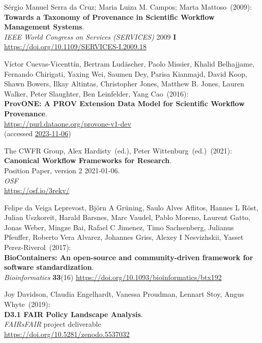 \begin{thebibliography}{9}
Sérgio Manuel Serra da Cruz; Maria Luiza M. Campos; Marta Mattoso~(2009):\\
\textbf{Towards a Taxonomy of Provenance in Scientific Workflow Management Systems}.\\
\emph{IEEE World Congress on Services (SERVICES)} 2009 \textbf{I}\\
\url{https://doi.org/10.1109/SERVICES-I.2009.18}

Víctor Cuevas-Vicenttín, Bertram Ludäscher, Paolo Missier, Khalid Belhajjame, Fernando Chirigati, Yaxing Wei, Saumen Dey, Parisa Kianmajd, David Koop, Shawn Bowers, Ilkay Altintas, Christopher Jones, Matthew B. Jones, Lauren Walker, Peter Slaughter, Ben Leinfelder, Yang Cao~(2016): \\
\textbf{ProvONE: A PROV Extension Data Model for Scientific Workflow Provenance}.\\
\url{https://purl.dataone.org/provone-v1-dev}\\
(accessed \href{https://web.archive.org/web/20231106005203/http://jenkins-1.dataone.org/jenkins/view/Documentation%20Projects/job/ProvONE-Documentation-trunk/ws/provenance/ProvONE/v1/provone.html}{2023-11-06})

The CWFR Group, Alex Hardisty~(ed.), Peter Wittenburg~(ed.)~(2021): \\
\textbf{Canonical Workflow Frameworks for Research}.\\
Position Paper, version 2 2021-01-06. \\
\emph{OSF} \\
\url{https://osf.io/3rekv/}

Felipe da Veiga Leprevost, Björn A Grüning, Saulo Alves Aflitos, Hannes L Röst, Julian Uszkoreit, Harald Barsnes, Marc Vaudel, Pablo Moreno, Laurent Gatto, Jonas Weber, Mingze Bai, Rafael C Jimenez, Timo Sachsenberg, Julianus Pfeuffer, Roberto Vera Alvarez, Johannes Griss, Alexey I Nesvizhskii, Yasset Perez-Riverol~(2017): \\
\textbf{BioContainers: An open-source and community-driven framework for software standardization}.\\
\emph{Bioinformatics} \textbf{33}(16) 
\url{https://doi.org/10.1093/bioinformatics/btx192}

Joy Davidson, Claudia Engelhardt,  Vanessa Proudman, Lennart Stoy, Angus Whyte~(2019): \\
\textbf{D3.1 FAIR Policy Landscape Analysis}.\\
\emph{FAIRsFAIR} project deliverable \\
\url{https://doi.org/10.5281/zenodo.5537032}


\end{thebibliography}
